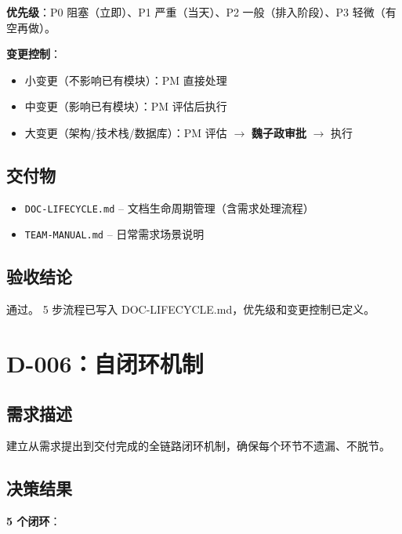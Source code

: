 \documentclass[11pt,a4paper]{article}
\begin{document}
\textbf{优先级}：P0 阻塞（立即）、P1 严重（当天）、P2 一般（排入阶段）、P3 轻微（有空再做）。

\textbf{变更控制}：
\begin{itemize}[nosep]
  \item 小变更（不影响已有模块）：PM 直接处理
  \item 中变更（影响已有模块）：PM 评估后执行
  \item 大变更（架构/技术栈/数据库）：PM 评估 $\to$ \textbf{魏子政审批} $\to$ 执行
\end{itemize}

\subsection{交付物}

\begin{itemize}[nosep]
  \item \texttt{DOC-LIFECYCLE.md} -- 文档生命周期管理（含需求处理流程）
  \item \texttt{TEAM-MANUAL.md} -- 日常需求场景说明
\end{itemize}

\subsection{验收结论}

\textcolor{success}{通过。} 5 步流程已写入 DOC-LIFECYCLE.md，优先级和变更控制已定义。

\section{D-006：自闭环机制}

\subsection{需求描述}

建立从需求提出到交付完成的全链路闭环机制，确保每个环节不遗漏、不脱节。

\subsection{决策结果}

\textbf{5 个闭环}：
\end{document}
